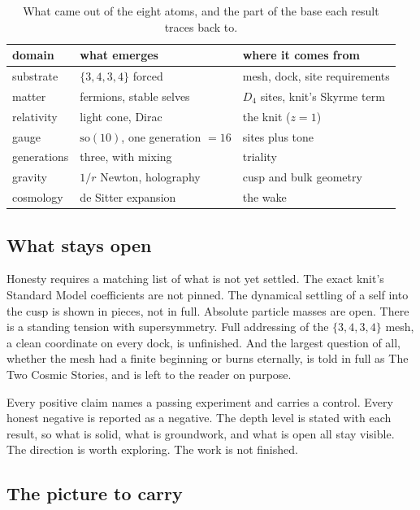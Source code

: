 \begin{table}[ht]
\centering
\begin{tabular}{@{}lll@{}}
\toprule
domain & what emerges & where it comes from \\
\midrule
substrate & $\{3,4,3,4\}$ forced & mesh, dock, site requirements \\
matter & fermions, stable selves & $D_4$ sites, knit's Skyrme term \\
relativity & light cone, Dirac & the knit ($z = 1$) \\
gauge & $\mathrm{so}(10)$, one generation $= 16$ & sites plus tone \\
generations & three, with mixing & triality \\
gravity & $1/r$ Newton, holography & cusp and bulk geometry \\
cosmology & de Sitter expansion & the wake \\
\bottomrule
\end{tabular}
\caption{What came out of the eight atoms, and the part of the base each result traces back to.}
\label{tab:conclusion-summary}
\end{table}

\subsection{What stays open}

Honesty requires a matching list of what is not yet settled. The exact knit's Standard Model coefficients are not pinned. The dynamical settling of a self into the cusp is shown in pieces, not in full. Absolute particle masses are open. There is a standing tension with supersymmetry. Full addressing of the $\{3,4,3,4\}$ mesh, a clean coordinate on every dock, is unfinished. And the largest question of all, whether the mesh had a finite beginning or burns eternally, is told in full as The Two Cosmic Stories, and is left to the reader on purpose.

\begin{principle}
Every positive claim names a passing experiment and carries a control. Every honest negative is reported as a negative. The depth level is stated with each result, so what is solid, what is groundwork, and what is open all stay visible. The direction is worth exploring. The work is not finished.
\end{principle}

\subsection{The picture to carry}

